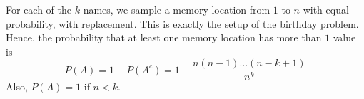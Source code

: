 For each of the $k$ names, we sample a memory location from $1$ to $n$ with 
equal probability, with replacement. This is exactly the setup of the birthday 
problem. Hence, the probability that at least one memory location has more than 
$1$ value is $$P(A) = 1 - P(A^{c}) = 1 - \frac{n(n-1) \dots (n-k+1)}{n^{k}}$$ 
Also, $P(A) = 1$ if $n < k$.